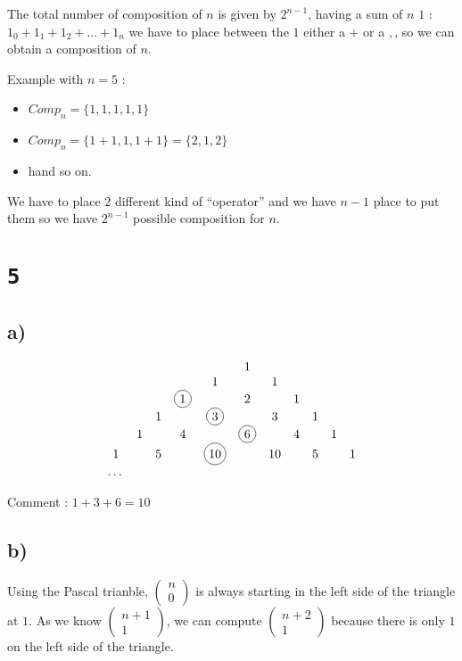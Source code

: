 \documentclass[a4paper,11pt]{report}
\newcommand*\circled[1]{\tikz[baseline=(char.base)]{
            \node[shape=circle,draw,inner sep=2pt] (char) {#1};}}
\begin{document}
The total number of composition of $n$ is given  by $2^{n-1}$, having a sum of
$n$ $1$ : $1_0+1_1+1_2+...+1_n$ we have to place between the $1$ either a $+$ or
a $,$, so we can obtain a composition of $n$.

Example with $n = 5$ :
\begin{itemize}
\item $Comp_n = \{1,1,1,1,1\}$
\item $Comp_n = \{1+1,1,1+1\} = \{2,1,2\}$
\item hand so on.
\end{itemize}

We have to place $2$ different kind of ``operator'' and we have $n-1$ place to
put them so we have $2^{n-1}$ possible composition for $n$.

\section*{\texttt{5}}
\subsection*{a)}

$$
\begin{array}{ccccccccccc}
  &    &    &    &    &  1 &    &    &    &    &   \cr
  &    &    &    &  1 &    &  1 &    &    &    &   \cr
  &    &    &  \circled{1} &    &  2 &    &  1 &    &    &   \cr
  &    &  1 &    &  \circled{3} &    &  3 &    &  1 &    &   \cr
  &  1 &    &  4 &    &  \circled{6} &    &  4 &    &  1 &   \cr
1 &    &  5 &    & \circled{10} &    & 10 &    &  5 &    & 1 \cr
\dots \cr
\end{array}
$$

Comment : $1 + 3 + 6 = 10$

\subsection*{b)}

Using the Pascal trianble, $\begin{pmatrix} n \\ 0\end{pmatrix}$ is always
starting in the left side of the triangle at $1$. As we know
$\begin{pmatrix} n+1 \\ 1\end{pmatrix}$, we can compute $\begin{pmatrix} n+2 \\
  1\end{pmatrix}$ because there is only $1$ on the left side of the triangle.
\end{document}
